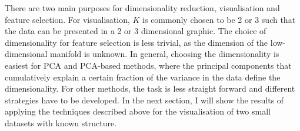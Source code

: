 There are two main purposes for dimensionality reduction, visualisation and feature selection.  For visualisation, \(K\) is commonly chosen to be \num{2} or \num{3} such that the data can be presented in a \num{2} or \num{3} dimensional graphic. The choice of dimensionality for feature selection is less trivial, as the dimension of the low-dimensional manifold is unknown. In general, choosing the dimensionality is easiest for PCA and PCA-based methods, where the principal components that cumulatively explain a certain fraction of the variance in the data define the dimensionality. For other methods, the task is less straight forward and different strategies have to be developed.  In the next section, I will show the results of applying the techniques described above for the visualisation of two small datasets with known structure.
